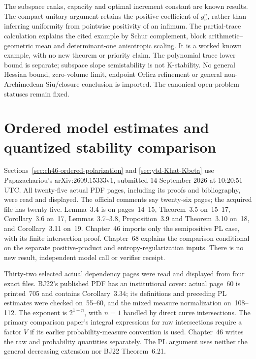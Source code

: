 The subspace ranks, capacity and optimal increment constant
are known results. The compact-unitary argument retains the
positive coefficient of $g_v^n$, rather than inferring uniformity
from pointwise positivity of an infimum. The partial-trace
calculation explains the cited example by Schur complement,
block arithmetic--geometric mean and determinant-one anisotropic
scaling. It is a worked known example, with no new theorem or
priority claim. The polynomial trace lower bound is separate;
subspace slope semistability is not K-stability.
No general Hessian bound, zero-volume limit, endpoint Orlicz
refinement or general non-Archimedean Siu/closure conclusion
is imported. The canonical open-problem statuses remain fixed.

\section{Ordered model estimates and quantized stability comparison}
\label{sec:provenance-Khat-Kbeta}

Sections~\ref{sec:ch46-ordered-polarization} and
\ref{sec:ytd-Khat-Kbeta} use Papazachariou's
arXiv:2609.15333v1, submitted 14 September 2026 at
10:20:51 UTC. All twenty-five actual PDF pages, including its
proofs and bibliography, were read and displayed. The official
comments say twenty-six pages; the acquired file has twenty-five.
Lemma~3.4 is on pages~14--15, Theorem~3.5 on~15--17,
Corollary~3.6 on~17, Lemmas~3.7--3.8, Proposition~3.9 and
Theorem~3.10 on~18, and Corollary~3.11 on~19.
Chapter~46 imports only the semipositive PL case, with its finite
intersection proof. Chapter~68 explains the comparison conditional
on the separate positive-product and entropy-regularization inputs.
There is no new result, independent model call or verifier receipt.

Thirty-two selected actual dependency pages were read and displayed
from four exact files. BJ22's published PDF has an institutional
cover: actual page~60 is printed~705 and contains Corollary~3.34;
its definitions and preceding PL estimates were checked on~55--60,
and the mixed measure normalization on~108--112.
The exponent is $2^{1-n}$, with $n=1$ handled by direct curve
intersections. The primary comparison paper's integral expressions
for raw intersections require a factor $V$ if its earlier
probability-measure convention is used. Chapter~46 writes the
raw and probability quantities separately. The PL argument uses
neither the general decreasing extension nor BJ22 Theorem~6.21.

